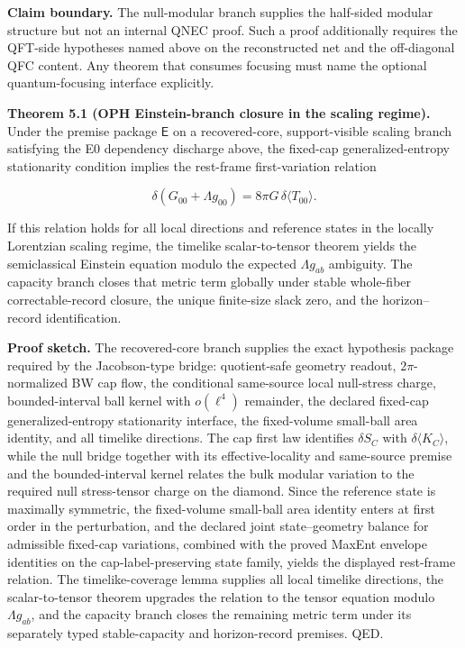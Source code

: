 \textbf{Claim boundary.} The null-modular branch supplies the half-sided
modular structure but not an internal QNEC proof. Such a proof additionally
requires the QFT-side hypotheses named above on the reconstructed net and the
off-diagonal QFC content. Any theorem that consumes focusing must name the
optional quantum-focusing interface explicitly.

\textbf{Theorem 5.1 (OPH Einstein-branch closure in the scaling regime).} Under the premise package \(\mathsf{E}\) on a recovered-core, support-visible scaling branch satisfying the E0 dependency discharge above, the fixed-cap generalized-entropy stationarity condition implies the rest-frame first-variation relation

\[
\delta\!\left(G_{00}+\Lambda g_{00}\right)=8\pi G\,\delta\langle T_{00}\rangle.
\]

If this relation holds for all local directions and reference states in the locally Lorentzian scaling regime, the timelike scalar-to-tensor theorem yields the semiclassical Einstein equation modulo the expected \(\Lambda g_{ab}\) ambiguity. The capacity branch closes that metric term globally under stable whole-fiber correctable-record closure, the unique finite-size slack zero, and the horizon--record identification.

\textbf{Proof sketch.} The recovered-core branch supplies the exact hypothesis package required by the Jacobson-type bridge: quotient-safe geometry readout, \(2\pi\)-normalized BW cap flow, the conditional same-source local null-stress charge, bounded-interval ball kernel with \(o(\ell^4)\) remainder, the declared fixed-cap generalized-entropy stationarity interface, the fixed-volume small-ball area identity, and all timelike directions. The cap first law identifies \(\delta S_C\) with \(\delta\langle K_C\rangle\), while the null bridge together with its effective-locality and same-source premise and the bounded-interval kernel relates the bulk modular variation to the required null stress-tensor charge on the diamond. Since the reference state is maximally symmetric, the fixed-volume small-ball area identity enters at first order in the perturbation, and the declared joint state--geometry balance for admissible fixed-cap variations, combined with the proved MaxEnt envelope identities on the cap-label-preserving state family, yields the displayed rest-frame relation. The timelike-coverage lemma supplies all local timelike directions, the scalar-to-tensor theorem upgrades the relation to the tensor equation modulo \(\Lambda g_{ab}\), and the capacity branch closes the remaining metric term under its separately typed stable-capacity and horizon-record premises. QED.

